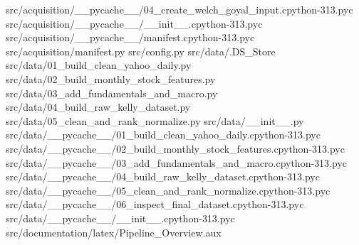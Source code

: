 \documentclass[
  11pt,
  a4paper]{article}
\newenvironment{Shaded}{}{}
\newcommand{\NormalTok}[1]{#1}
\begin{document}
\begin{Shaded}
\begin{Highlighting}[]
\NormalTok{src/acquisition/\_\allowbreak{}\_\allowbreak{}pycache\_\allowbreak{}\_\allowbreak{}/04\_\allowbreak{}create\_\allowbreak{}welch\_\allowbreak{}goyal\_\allowbreak{}input.cpython{-}313.pyc}
\NormalTok{src/acquisition/\_\allowbreak{}\_\allowbreak{}pycache\_\allowbreak{}\_\allowbreak{}/\_\allowbreak{}\_\allowbreak{}init\_\allowbreak{}\_\allowbreak{}.cpython{-}313.pyc}
\NormalTok{src/acquisition/\_\allowbreak{}\_\allowbreak{}pycache\_\allowbreak{}\_\allowbreak{}/manifest.cpython{-}313.pyc}
\NormalTok{src/acquisition/manifest.py}
\NormalTok{src/config.py}
\NormalTok{src/data/.DS\_\allowbreak{}Store}
\NormalTok{src/data/01\_\allowbreak{}build\_\allowbreak{}clean\_\allowbreak{}yahoo\_\allowbreak{}daily.py}
\NormalTok{src/data/02\_\allowbreak{}build\_\allowbreak{}monthly\_\allowbreak{}stock\_\allowbreak{}features.py}
\NormalTok{src/data/03\_\allowbreak{}add\_\allowbreak{}fundamentals\_\allowbreak{}and\_\allowbreak{}macro.py}
\NormalTok{src/data/04\_\allowbreak{}build\_\allowbreak{}raw\_\allowbreak{}kelly\_\allowbreak{}dataset.py}
\NormalTok{src/data/05\_\allowbreak{}clean\_\allowbreak{}and\_\allowbreak{}rank\_\allowbreak{}normalize.py}
\NormalTok{src/data/\_\allowbreak{}\_\allowbreak{}init\_\allowbreak{}\_\allowbreak{}.py}
\NormalTok{src/data/\_\allowbreak{}\_\allowbreak{}pycache\_\allowbreak{}\_\allowbreak{}/01\_\allowbreak{}build\_\allowbreak{}clean\_\allowbreak{}yahoo\_\allowbreak{}daily.cpython{-}313.pyc}
\NormalTok{src/data/\_\allowbreak{}\_\allowbreak{}pycache\_\allowbreak{}\_\allowbreak{}/02\_\allowbreak{}build\_\allowbreak{}monthly\_\allowbreak{}stock\_\allowbreak{}features.cpython{-}313.pyc}
\NormalTok{src/data/\_\allowbreak{}\_\allowbreak{}pycache\_\allowbreak{}\_\allowbreak{}/03\_\allowbreak{}add\_\allowbreak{}fundamentals\_\allowbreak{}and\_\allowbreak{}macro.cpython{-}313.pyc}
\NormalTok{src/data/\_\allowbreak{}\_\allowbreak{}pycache\_\allowbreak{}\_\allowbreak{}/04\_\allowbreak{}build\_\allowbreak{}raw\_\allowbreak{}kelly\_\allowbreak{}dataset.cpython{-}313.pyc}
\NormalTok{src/data/\_\allowbreak{}\_\allowbreak{}pycache\_\allowbreak{}\_\allowbreak{}/05\_\allowbreak{}clean\_\allowbreak{}and\_\allowbreak{}rank\_\allowbreak{}normalize.cpython{-}313.pyc}
\NormalTok{src/data/\_\allowbreak{}\_\allowbreak{}pycache\_\allowbreak{}\_\allowbreak{}/06\_\allowbreak{}inspect\_\allowbreak{}final\_\allowbreak{}dataset.cpython{-}313.pyc}
\NormalTok{src/data/\_\allowbreak{}\_\allowbreak{}pycache\_\allowbreak{}\_\allowbreak{}/\_\allowbreak{}\_\allowbreak{}init\_\allowbreak{}\_\allowbreak{}.cpython{-}313.pyc}
\NormalTok{src/documentation/latex/Pipeline\_\allowbreak{}Overview.aux}

\end{Highlighting}
\end{Shaded}
\end{document}
